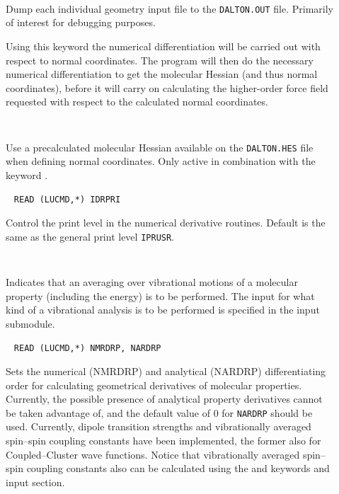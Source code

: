\begin{description}
\item[]\verb| |\newline

Dump each individual geometry input file to the \verb|DALTON.OUT|
file. Primarily of interest for debugging purposes.

\item[]
Using this keyword the numerical differentiation will be carried out
with respect to normal coordinates. The program will then do the
necessary numerical differentiation to get the molecular Hessian (and thus
normal coordinates), before it will carry on calculating the
higher-order force field requested with respect to the calculated normal
coordinates.

\item[]\verb| |\newline

Use a precalculated molecular Hessian available on the \verb|DALTON.HES| file
when defining normal coordinates. Only active in combination with the
keyword .

\item[]\verb| |\newline
\verb|READ (LUCMD,*) IDRPRI|

Control the print level in the numerical derivative routines. Default
is the same as the general print level \verb|IPRUSR|.

\item[]\verb| |\newline

Indicates that an averaging over vibrational motions of a molecular
property (including the energy) is to be performed. The input
for what kind of a vibrational analysis is to be performed is
specified in the  input submodule.

\item[]\verb| |\newline
\verb|READ (LUCMD,*) NMRDRP, NARDRP|

Sets the numerical (NMRDRP) and analytical (NARDRP) differentiating
order for calculating geometrical derivatives of molecular
properties. Currently, the possible presence of analytical property
derivatives cannot be taken advantage of, and the default value of $0$
for \verb|NARDRP| should be used. Currently, dipole transition
strengths and vibrationally averaged spin--spin coupling constants
have been implemented, the former also for Coupled--Cluster wave
functions. Notice that vibrationally
averaged spin--spin coupling constants also can be calculated using
the  and  keywords and input section.


\end{description}
